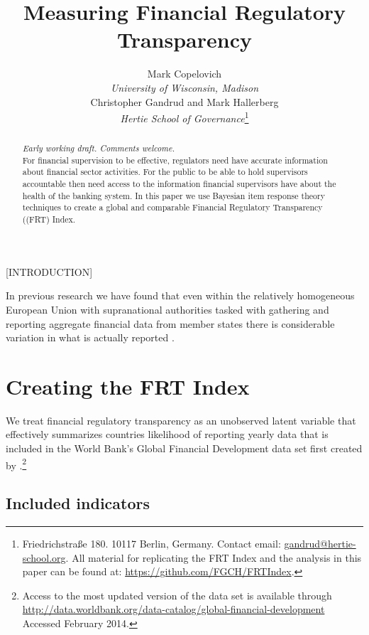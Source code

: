 \documentclass[a4paper]{article}
\title{Measuring Financial Regulatory Transparency}
\author{Mark Copelovich \\ \emph{University of Wisconsin, Madison} \\[0.5cm] Christopher Gandrud and Mark Hallerberg \\ 
    {\emph{Hertie School of Governance}}\footnote{Friedrichstra{\ss}e 180. 10117 Berlin, Germany. Contact email: \href{mailto:gandrud@hertie-school.org}{gandrud@hertie-school.org}. All material for replicating the FRT Index and the analysis in this paper can be found at: \url{https://github.com/FGCH/FRTIndex}.}}
\begin{document}
\maketitle

\begin{abstract}
\noindent \emph{Early working draft. Comments welcome.} \\
For financial supervision to be effective, regulators need have accurate information about financial sector activities. For the public to be able to hold supervisors accountable then need access to the information financial supervisors have about the health of the banking system. In this paper we use Bayesian item response theory techniques to create a global and comparable Financial Regulatory Transparency ((FRT) Index.  
\end{abstract}

[INTRODUCTION]

In previous research we have found that even within the relatively homogeneous European Union with supranational authorities tasked with gathering and reporting aggregate financial data from member states there is considerable variation in what is actually reported \cite[see][]{Gandrud2014a}.  

\section{Creating the FRT Index}

We treat financial regulatory transparency as an unobserved latent variable that effectively summarizes countries likelihood of reporting yearly data that is included in the World Bank's Global Financial Development data set first created by \cite{Cihak2012}.\footnote{Access to the most updated version of the data set is available through \url{http://data.worldbank.org/data-catalog/global-financial-development} Accessed February 2014.}

\subsection{Included indicators}
\end{document}
